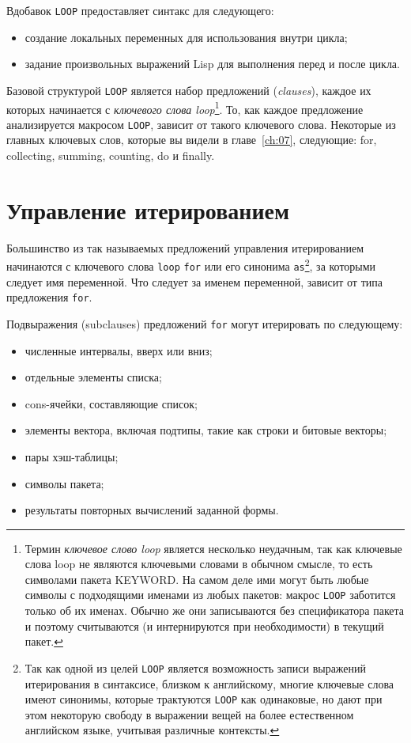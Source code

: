 Вдобавок \lstinline{LOOP} предоставляет синтакс для следующего:

\begin{itemize}
\item создание локальных переменных для использования внутри цикла;
\item задание произвольных выражений Lisp для выполнения перед и после цикла.
\end{itemize}

Базовой структурой \lstinline{LOOP} является набор предложений (\textit{clauses}), каждое их
которых начинается с \textit{ключевого слова loop}\footnote{Термин \textit{ключевое слово
    loop} является несколько неудачным, так как ключевые слова loop не являются ключевыми
  словами в обычном смысле, то есть символами пакета KEYWORD. На самом деле ими могут быть
  любые символы с подходящими именами из любых пакетов: макрос \lstinline{LOOP} заботится
  только об их именах. Обычно же они записываются без спецификатора пакета и поэтому
  считываются (и интернируются при необходимости) в текущий пакет.}\hspace{\footnotenegspace}. То, как каждое
предложение анализируется макросом \lstinline{LOOP}, зависит от такого ключевого
слова. Некоторые из главных ключевых слов, которые вы видели в главе~\ref{ch:07},
следующие: for, collecting, summing, counting, do и finally.

\section{Управление итерированием}

Большинство из так называемых предложений управления итерированием начинаются с ключевого
слова \lstinline{loop} \lstinline{for} или его синонима \lstinline{as}\footnote{Так как одной из целей
  \lstinline{LOOP} является возможность записи выражений итерирования в синтаксисе, близком к
  английскому, многие ключевые слова имеют синонимы, которые трактуются \lstinline{LOOP} как
  одинаковые, но дают при этом некоторую свободу в выражении вещей на более естественном
  английском языке, учитывая различные контексты.}\hspace{\footnotenegspace}, за которыми следует имя переменной. Что
следует за именем переменной, зависит от типа предложения \lstinline{for}.

Подвыражения (subclauses) предложений \lstinline{for} могут итерировать по следующему:
\begin{itemize}
\item численные интервалы, вверх или вниз;
\item отдельные элементы списка;
\item cons-ячейки, составляющие список;
\item элементы вектора, включая подтипы, такие как строки и битовые векторы;
\item пары хэш-таблицы;
\item символы пакета;
\item результаты повторных вычислений заданной формы.
\end{itemize}

